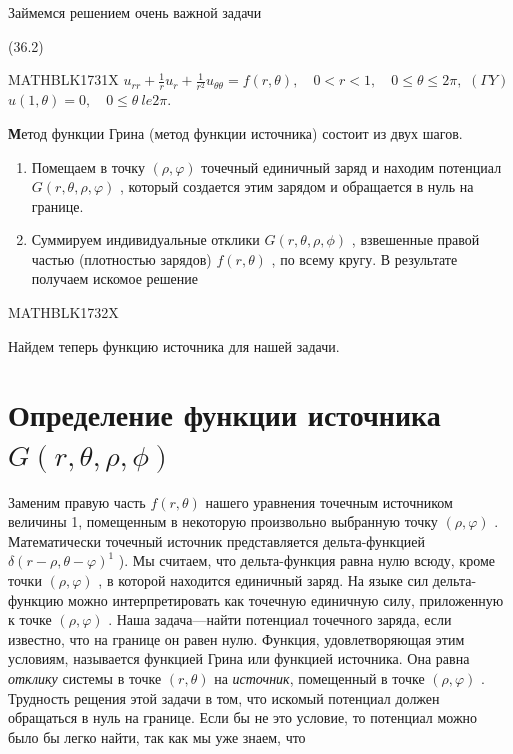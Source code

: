 \documentclass[
]{article}
\begin{document}
{{{Займемся решением очень важной задачи

(36.2)

MATHBLK1731X
\(u_{rr} + \frac{1}{r} u_r + \frac{1}{r^2} u_{\theta\theta} = f(r, \theta), \quad 0 < r < 1, \quad 0 \le \theta \le 2\pi,\)
\((\Gamma Y)\) \(u(1, \theta) = 0, \quad 0 \le \theta \ le 2\pi.\)

\textbf{М}етод функции Грина (метод функции источника) состоит из двух
шагов.

\begin{enumerate}
\def\labelenumi{\arabic{enumi}.}
\item
  Помещаем в точку \((\rho, \varphi)\) точечный единичный заряд и
  находим потенциал \(G(r, \theta, \rho, \varphi)\) , который создается
  этим зарядом и обращается в нуль на границе.
\item
  Суммируем индивидуальные отклики \(G(r, \theta, \rho, \phi)\) ,
  взвешенные правой частью (плотностью зарядов) \(f(r, \theta)\) , по
  всему кругу. В результате получаем искомое решение
\end{enumerate}

MATHBLK1732X

Найдем теперь функцию источника для нашей задачи.

\section{\texorpdfstring{Определение функции источника
\(G(r, \theta, \rho, \phi)\)}{Определение функции источника G(r, \textbackslash theta, \textbackslash rho, \textbackslash phi)}}\label{ux43eux43fux440ux435ux434ux435ux43bux435ux43dux438ux435-ux444ux443ux43dux43aux446ux438ux438-ux438ux441ux442ux43eux447ux43dux438ux43aux430-gr-theta-rho-phi}

Заменим правую часть \(f(r,\theta)\) нашего уравнения точечным
источником величины 1, помещенным в некоторую произвольно выбранную
точку \((\rho, \varphi)\) . Математически точечный источник
представляется дельта-функцией \(\delta(r-\rho, \theta-\varphi)^1\) ).
Мы считаем, что дельта-функция равна нулю всюду, кроме точки
\((\rho, \varphi)\) , в которой находится единичный заряд. На языке сил
дельта-функцию можно интерпретировать как точечную единичную силу,
приложенную к точке \((\rho, \varphi)\) . Наша задача---найти потенциал
точечного заряда, если известно, что на границе он равен нулю. Функция,
удовлетворяющая этим условиям, называется функцией Грина или функцией
источника. Она равна \emph{отклику} системы в точке \((r, \theta)\) на
\emph{источник}, помещенный в точке \((\rho, \varphi)\) . Трудность
рещения этой задачи в том, что искомый потенциал должен обращаться в
нуль на границе. Если бы не это условие, то потенциал можно было бы
легко найти, так как мы уже знаем, что

}}}
\end{document}
